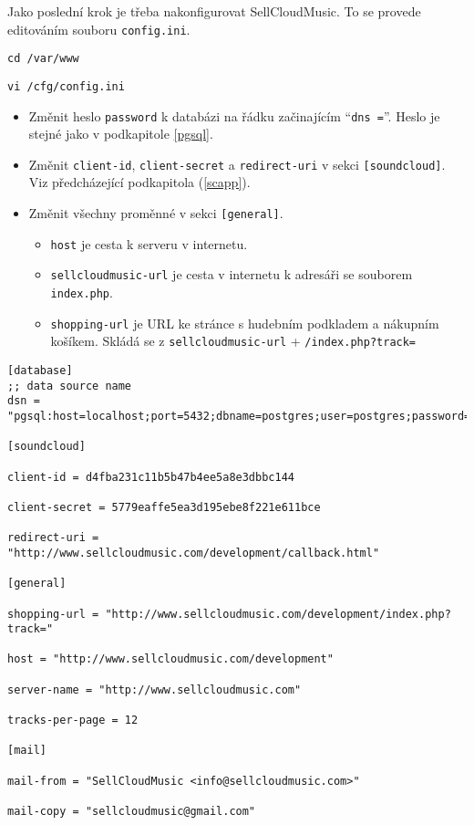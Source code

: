 \documentclass[12pt]{article}
\begin{document}
Jako poslední krok je třeba nakonfigurovat SellCloudMusic. To se provede editováním souboru \texttt{config.ini}.\newline

\texttt{cd /var/www}

\texttt{vi /cfg/config.ini}

\begin{itemize}
\item Změnit heslo \texttt{password} k databázi na řádku začinajícím ``\texttt{dns =}''. Heslo je stejné jako v podkapitole \ref{pgsql}.
\item Změnit \texttt{client-id}, \texttt{client-secret} a \texttt{redirect-uri} v sekci \texttt{[soundcloud]}. Viz předcházející podkapitola (\ref{scapp}).
\item Změnit všechny proměnné v sekci \texttt{[general]}.
  \begin{itemize}
  \item \texttt{host} je cesta k serveru v internetu.
  \item \texttt{sellcloudmusic-url} je cesta v internetu k adresáři se souborem \texttt{index.php}.
  \item \texttt{shopping-url} je URL ke stránce s hudebním podkladem a nákupním košíkem. Skládá se z \texttt{sellcloudmusic-url} + \texttt{/index.php?track=}
  \end{itemize}
\end{itemize}

\lstset{language=sh}
\begin{lstlisting}[caption={config.ini}]
[database]
;; data source name 
dsn = "pgsql:host=localhost;port=5432;dbname=postgres;user=postgres;password=heslo123"

[soundcloud]

client-id = d4fba231c11b5b47b4ee5a8e3dbbc144

client-secret = 5779eaffe5ea3d195ebe8f221e611bce

redirect-uri = "http://www.sellcloudmusic.com/development/callback.html"

[general]

shopping-url = "http://www.sellcloudmusic.com/development/index.php?track="

host = "http://www.sellcloudmusic.com/development"

server-name = "http://www.sellcloudmusic.com"

tracks-per-page = 12

[mail]

mail-from = "SellCloudMusic <info@sellcloudmusic.com>"

mail-copy = "sellcloudmusic@gmail.com"

\end{lstlisting}
\end{document}
